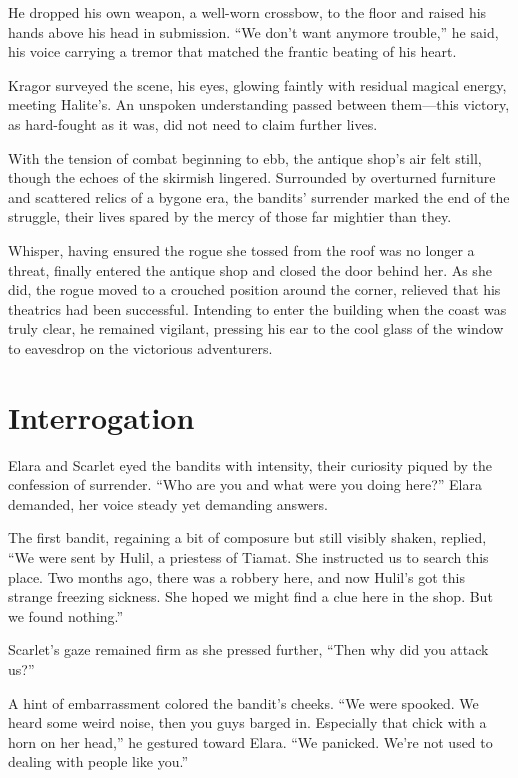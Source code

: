 \documentclass[
  letterpaper,12pt,twoside,twocolumn,openany,
  nodeprecatedcode,bg=full]{dndbook}
\begin{document}
He dropped his own weapon, a well-worn crossbow, to the floor and raised
his hands above his head in submission. ``We don't want anymore
trouble,'' he said, his voice carrying a tremor that matched the frantic
beating of his heart.

Kragor surveyed the scene, his eyes, glowing faintly with residual
magical energy, meeting Halite's. An unspoken understanding passed
between them---this victory, as hard-fought as it was, did not need to
claim further lives.

With the tension of combat beginning to ebb, the antique shop's air felt
still, though the echoes of the skirmish lingered. Surrounded by
overturned furniture and scattered relics of a bygone era, the bandits'
surrender marked the end of the struggle, their lives spared by the
mercy of those far mightier than they.

Whisper, having ensured the rogue she tossed from the roof was no longer
a threat, finally entered the antique shop and closed the door behind
her. As she did, the rogue moved to a crouched position around the
corner, relieved that his theatrics had been successful. Intending to
enter the building when the coast was truly clear, he remained vigilant,
pressing his ear to the cool glass of the window to eavesdrop on the
victorious adventurers.

\section{Interrogation}\label{interrogation}

Elara and Scarlet eyed the bandits with intensity, their curiosity
piqued by the confession of surrender. ``Who are you and what were you
doing here?'' Elara demanded, her voice steady yet demanding answers.

The first bandit, regaining a bit of composure but still visibly shaken,
replied, ``We were sent by Hulil, a priestess of Tiamat. She instructed
us to search this place. Two months ago, there was a robbery here, and
now Hulil's got this strange freezing sickness. She hoped we might find
a clue here in the shop. But we found nothing.''

Scarlet's gaze remained firm as she pressed further, ``Then why did you
attack us?''

A hint of embarrassment colored the bandit's cheeks. ``We were spooked.
We heard some weird noise, then you guys barged in. Especially that
chick with a horn on her head,'' he gestured toward Elara. ``We
panicked. We're not used to dealing with people like you.''
\end{document}

